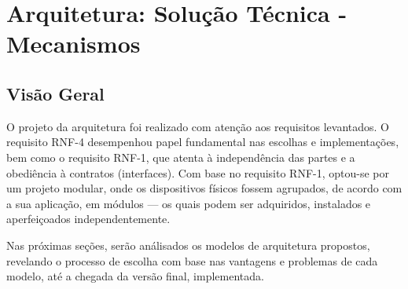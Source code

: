 \chapter{Arquitetura: Solução Técnica - Mecanismos}

\section{Visão Geral}

O projeto da arquitetura foi realizado com atenção aos requisitos levantados. O requisito RNF-4 desempenhou papel fundamental nas escolhas e implementações, bem como o requisito RNF-1, que atenta à independência das partes e a obediência à contratos (interfaces). Com base no requisito RNF-1, optou-se por um projeto modular, onde os dispositivos físicos fossem agrupados, de acordo com a sua aplicação, em módulos --- os quais podem ser adquiridos, instalados e aperfeiçoados independentemente.

Nas próximas seções, serão análisados os modelos de arquitetura propostos, revelando o processo de escolha com base nas vantagens e problemas de cada modelo, até a chegada da versão final, implementada. 












